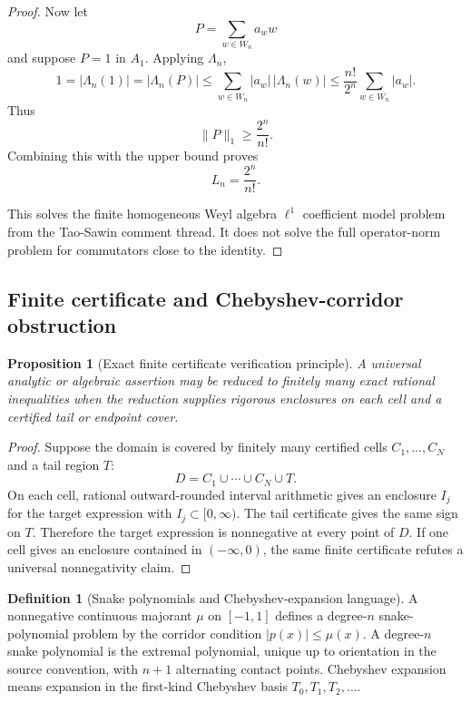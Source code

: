 \documentclass[11pt]{article}
\numberwithin{equation}{section}
\newtheorem{proposition}[theorem]{Proposition}
\theoremstyle{definition}
\newtheorem{definition}{Definition}[section]
\theoremstyle{remark}
\newcommand{\1}{\mathbf 1}
\begin{document}
\begin{proof}
Now let
\[
P=\sum_{w\in W_n}a_w w
\]
and suppose \(P=1\) in \(A_1\). Applying \(\Lambda_n\),
\[
1=|\Lambda_n(1)|
=
|\Lambda_n(P)|
\le
\sum_{w\in W_n}|a_w|\,|\Lambda_n(w)|
\le
\frac{n!}{2^n}\sum_{w\in W_n}|a_w|.
\]
Thus
\[
\|P\|_1\ge\frac{2^n}{n!}.
\]
Combining this with the upper bound proves
\[
L_n=\frac{2^n}{n!}.
\]

This solves the finite homogeneous Weyl algebra \(\ell^1\) coefficient model problem from the Tao-Sawin comment thread. It does not solve the full operator-norm problem for commutators close to the identity.
\end{proof}


\subsection{Finite certificate and Chebyshev-corridor obstruction}

\begin{proposition}[Exact finite certificate verification principle]
\label{res:exact-finite-certificate-verification-principle}
A universal analytic or algebraic assertion may be reduced to finitely many exact rational inequalities when the reduction supplies rigorous enclosures on each cell and a certified tail or endpoint cover.
\end{proposition}

\begin{proof}
Suppose the domain is covered by finitely many certified cells \(C_1,\ldots,C_N\) and a tail region \(T\):
\[
D=C_1\cup\cdots\cup C_N\cup T.
\]
On each cell, rational outward-rounded interval arithmetic gives an enclosure \(I_j\) for the target expression with \(I_j\subset[0,\infty)\). The tail certificate gives the same sign on \(T\). Therefore the target expression is nonnegative at every point of \(D\). If one cell gives an enclosure contained in \((-
\infty,0)\), the same finite certificate refutes a universal nonnegativity claim.
\end{proof}

\begin{definition}[Snake polynomials and Chebyshev-expansion language]
\label{res:snakepolynomial-chebyshev-language}
A nonnegative continuous majorant \(\mu\) on \([-1,1]\) defines a degree-\(n\) snake-polynomial problem by the corridor condition \(|p(x)|\le \mu(x)\). A degree-\(n\) snake polynomial is the extremal polynomial, unique up to orientation in the source convention, with \(n+1\) alternating contact points. Chebyshev expansion means expansion in the first-kind Chebyshev basis \(T_0,T_1,T_2,\ldots\).
\end{definition}
\end{document}
